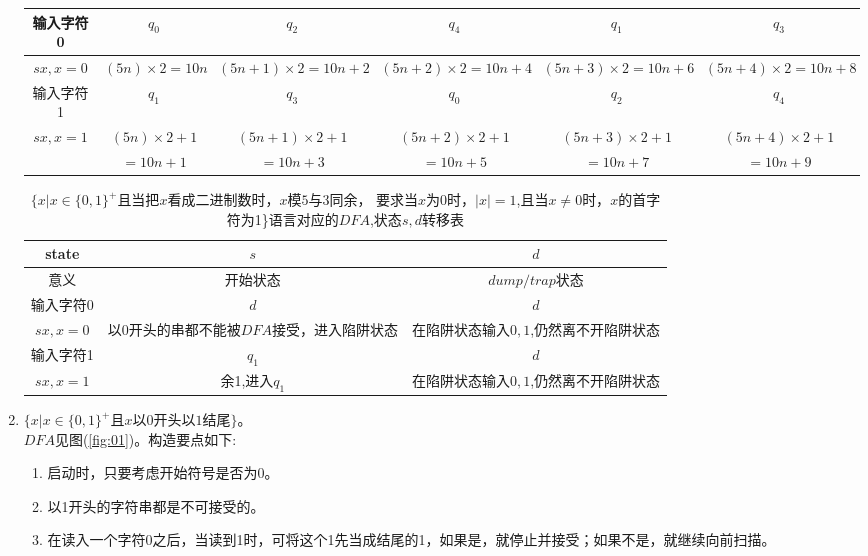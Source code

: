 \begin{solution}
\begin{enumerate}
\begin{table}[htbp]
\begin{tabular}{|c||c|c|c|c|c|}
    	    输入字符0&$q_0$&$q_2$&$q_4$&$q_1$&$q_3$\\
    	    \hline
    	    $sx,x=0$&$(5n)\times 2=10n$&$(5n+1)\times 2=10n+2$&$(5n+2)\times 2=10n+4$&$(5n+3)\times 2=10n+6$&$(5n+4)\times 2=10n+8$\\
    	    \hline
    	    \cline{1-6}  %
    	    输入字符1&$q_1$&$q_3$&$q_0$&$q_2$&$q_4$\\
    	    \hline
    	    $sx,x=1$&$(5n)\times 2+1$&$(5n+1)\times 2+1$&$(5n+2)\times 2+1$&$(5n+3)\times 2+1$&$(5n+4)\times 2+1$\\
    	            &$=10n+1$&$=10n+3$&$=10n+5$&$=10n+7$&$=10n+9$\\
    	    \hline
   		\end{tabular} 
	\end{table}	
    \begin{table}[htbp]
    	\caption{$\{x|x\in \{0,1\}^+ \text{且当把$x$看成二进制数时，$x$模5与3同余，}$\newline 
    		要求当$x$为0时，$|x|=1$,且当$x\ne 0$时，$x$的首字符为1\}语言对应的$DFA$,状态$s,d$转移表}
    	\label{tab:mod_5_1}
    	\centering
    	\begin{tabular}{|c||c|c|}
    		\hline
    		state&$s$&$d$\\
    		\hline
    		意义&开始状态&$dump/trap$状态\\
    		\hline
    		\cline{1-3}  %
    		输入字符0&$d$&$d$\\
    		\hline
    		$sx,x=0$&以0开头的串都不能被$DFA$接受，进入陷阱状态&在陷阱状态输入$0,1$,仍然离不开陷阱状态\\
    		\hline
    		\cline{1-3}  %
    		输入字符1&$q_1$&$d$\\
    		\hline
    		$sx,x=1$&余1,进入$q_1$&在陷阱状态输入$0,1$,仍然离不开陷阱状态\\
    		\hline
    	\end{tabular} 
    \end{table}	
\item $\{x|x\in\{0,1\}^+\text{且$x$以0开头以1结尾}\}$。\\
	$DFA$见图(\ref{fig:01})。构造要点如下:
	\begin{enumerate}
		\item 启动时，只要考虑开始符号是否为0。
		\item 以1开头的字符串都是不可接受的。
		\item 在读入一个字符0之后，当读到1时，可将这个1先当成结尾的1，如果是，就停止并接受；如果不是，就继续向前扫描。

\end{enumerate}
\end{enumerate}
\end{solution}
